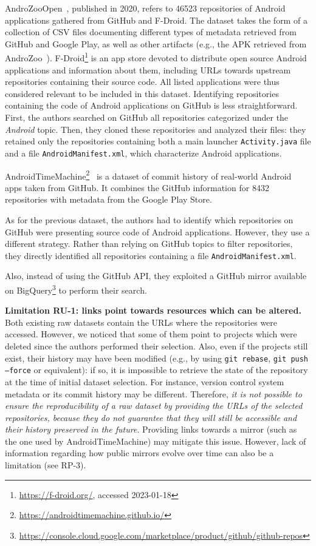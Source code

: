 AndroZooOpen~\cite{liu2020androzooopen}, published in 2020, refers to \num{46523} repositories of Android applications gathered from GitHub and F-Droid.
The dataset takes the form of a collection of CSV files documenting different types of metadata retrieved from GitHub and Google Play, as well as other artifacts (e.g., the APK retrieved from AndroZoo~\cite{allix2016androzoo}).
F-Droid\footnote{\url{https://f-droid.org/}, accessed 2023-01-18} is an app store devoted to distribute open source Android applications and information about them, including URLs towards upstream repositories containing their source code. 
All listed applications were thus considered relevant to be included in this dataset.
Identifying repositories containing the code of Android applications on GitHub is less straightforward. 
First, the authors searched on GitHub all repositories categorized under the \emph{Android} topic.
Then, they cloned these repositories and analyzed their files: they retained only the repositories containing both a main launcher \texttt{Activity.java} file and a file \texttt{AndroidManifest.xml}, which characterize Android applications.

AndroidTimeMachine\footnote{\url{https://androidtimemachine.github.io/}}~\cite{geiger2018graph} is a dataset of commit history of real-world Android apps taken from GitHub.
It combines the GitHub information for \num{8432} repositories with metadata from the Google Play Store. 

As for the previous dataset, the authors had to identify which repositories on GitHub were presenting source code of Android applications.
However, they use a different strategy.
Rather than relying on GitHub topics to filter repositories, they directly identified all repositories containing a file \texttt{AndroidManifest.xml}.

Also, instead of using the GitHub API, they exploited a GitHub mirror available on BigQuery\footnote{\url{https://console.cloud.google.com/marketplace/product/github/github-repos}} to perform their search.


\bigskip

\textbf{Limitation RU-1: links point towards resources which can be altered.}
Both existing raw datasets contain the URLs where the repositories were accessed.
However, we noticed that some of them point to projects which were deleted since the authors performed their selection.
Also, even if the projects still exist, their history may have been modified (e.g., by using \texttt{git rebase}, \texttt{git push --force} or equivalent): if so, it is impossible to retrieve the state of the repository at the time of initial dataset selection.
For instance, version control system metadata or its commit history may be different.
Therefore, \emph{it is not possible to ensure the reproducibility of a raw dataset by providing the URLs of the selected repositories, because they do not guarantee that they will still be accessible and their history preserved in the future}. Providing links towards a mirror (such as the one used by AndroidTimeMachine) may mitigate this issue. However, lack of information regarding how public mirrors evolve over time can also be a limitation (see RP-3).

